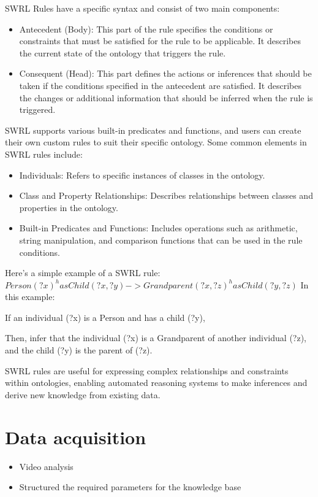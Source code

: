 \documentclass[	pdftex, 
								a4paper,
								11pt, DIV11, BCOR5mm,
								parskip,
								]{scrreprt}
\begin{document}
	SWRL Rules have a specific syntax and consist of two main components:
	\begin{itemize}
		\item Antecedent (Body): This part of the rule specifies the conditions or constraints that must be satisfied for the rule to be applicable. It describes the current state of the ontology that triggers the rule.
		\item Consequent (Head): This part defines the actions or inferences that should be taken if the conditions specified in the antecedent are satisfied. It describes the changes or additional information that should be inferred when the rule is triggered.
	\end{itemize}
	SWRL supports various built-in predicates and functions, and users can create their own custom rules to suit their specific ontology. Some common elements in SWRL rules include:
	\begin{itemize}
		\item Individuals: Refers to specific instances of classes in the ontology.
		\item Class and Property Relationships: Describes relationships between classes and properties in the ontology.
		\item Built-in Predicates and Functions: Includes operations such as arithmetic, string manipulation, and comparison functions that can be used in the rule conditions.
	\end{itemize}
	Here's a simple example of a SWRL rule:
	\newline
	$Person(?x) ^ hasChild(?x, ?y) -> Grandparent(?x, ?z) ^ hasChild(?y, ?z)$
	\newline
	In this example:

	If an individual (?x) is a Person and has a child (?y),
	
	Then, infer that the individual (?x) is a Grandparent of another individual (?z), and the child (?y) is the parent of (?z).
	
	SWRL rules are useful for expressing complex relationships and constraints within ontologies, enabling automated reasoning systems to make inferences and derive new knowledge from existing data.

	\chapter*{Data acquisition}
	\begin{itemize}
		\item Video analysis
		\item Structured the required parameters for the knowledge base
	\end{itemize}
\end{document}

